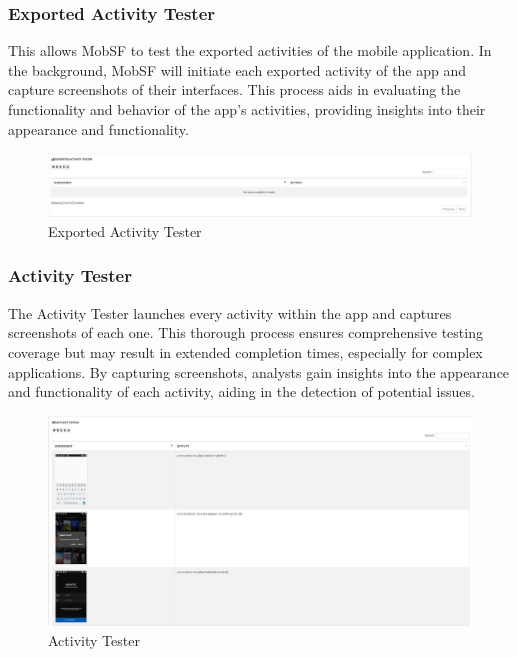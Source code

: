 \documentclass{report}
\begin{document}
\subsubsection{Exported Activity Tester}

This allows MobSF to test the exported activities of the mobile application. In the background, MobSF will initiate each exported activity of the app and capture screenshots of their interfaces. This process aids in evaluating the functionality and behavior of the app's activities, providing insights into their appearance and functionality.
\begin{figure}[hbt!]
    \centering
    \includegraphics[width=1\linewidth]{Dynamic Analyzer/exported_rep.jpg}
    \caption{Exported Activity Tester}
    \label{fig:example}
\end{figure}
\FloatBarrier

\subsubsection{Activity Tester}
The Activity Tester launches every activity within the app and captures screenshots of each one. This thorough process ensures comprehensive testing coverage but may result in extended completion times, especially for complex applications. By capturing screenshots, analysts gain insights into the appearance and functionality of each activity, aiding in the detection of potential issues. 
\begin{figure}[hbt!]
    \centering
    \includegraphics[width=1\linewidth]{Dynamic Analyzer/activity_rep.jpg}
    \caption{Activity Tester}
    \label{fig:example}
\end{figure}
\FloatBarrier
\end{document}
